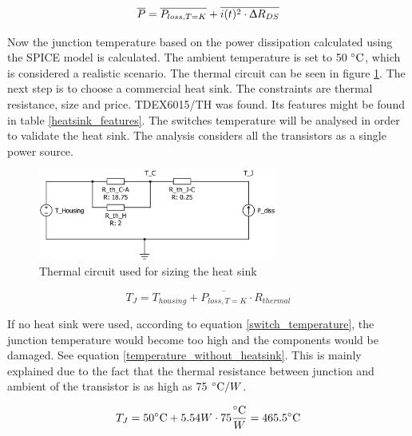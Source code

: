 
\begin{equation} \label{total_losses}
\overline{P} = \overline{P_{loss, T = K}} + \overline{i(t)^2 \cdot \Updelta R_{DS}}
\end{equation}

Now the junction temperature based on the power dissipation calculated using the SPICE model is calculated. The ambient temperature is set to 50 $\decC$, which is considered a realistic scenario. The thermal circuit can be seen in figure \ref{thermal_circuit}. The next step is to choose a commercial heat sink. The constraints are thermal resistance, size and price. TDEX6015/TH was found. Its features might be found in table \ref{heatsink_features}. The switches temperature will be analysed in order to validate the heat sink. The analysis considers all the transistors as a single power source.

\begin{figure}[H]
	\begin{center}
		\includegraphics[width=0.7\textwidth]{../Pictures/thermal_circuit.png}
		\caption{Thermal circuit used for sizing the heat sink}
		\label{thermal_circuit}
	\end{center}	
\end{figure}

\begin{equation} \label{switch_temperature}
T_{J} = T_{housing} + \overline{P_{loss, T = K}} \cdot  R_{thermal}
\end{equation}


If no heat sink were used, according to equation \ref{switch_temperature}, the junction temperature would become too high and the components would be damaged. See equation \ref{temperature_without_heatsink}. This is mainly explained due to the fact that the thermal resistance between junction and ambient of the transistor is as high as 75 $\decC / W$.

\begin{equation} \label{temperature_without_heatsink}
T_{J} = 50 \decC + 5.54 W \cdot 75 \frac{\decC}{W} = 465.5 \decC
\end{equation}


